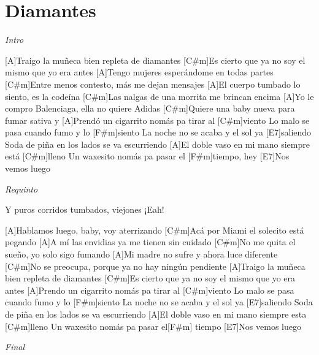 \section{Diamantes}

\noindent
\vspace{1cm}

\begin{guitar}
	\begin{multicols}{2}
		
		\textit{Intro}
		\par

		[A]Traigo la muñeca bien repleta de diamantes
		[C#m]Es cierto que ya no soy el mismo que yo era antes
		[A]Tengo mujeres esperándome en todas partes
		[C#m]Entre menos contesto, más me dejan mensajes
		[A]El cuerpo tumbado lo siento, es la codeína
		[C#m]Las nalgas de una morrita me brincan encima
		[A]Yo le compro Balenciaga, ella no quiere Adidas
		[C#m]Quiere una baby nueva para fumar sativa y
		[A]Prendó un cigarrito nomás pa tirar al [C#m]viento
		Lo malo se pasa cuando fumo y lo [F#m]siento
		La noche no se acaba y el sol ya [E7]saliendo
		Soda de piña en los lados se va escurriendo
		[A]El doble vaso en mi mano siempre está [C#m]lleno
		Un waxesito nomás pa pasar el [F#m]tiempo, hey
		[E7]Nos vemos luego

		\par
		\textit{Requinto}
		\par

		Y puros corridos tumbados, viejones
		¡Eah!
		
		[A]Hablamos luego, baby, voy aterrizando
		[C#m]Acá por Miami el solecito está pegando
		[A]A mí las envidias ya me tienen sin cuidado
		[C#m]No me quita el sueño, yo solo sigo fumando
		[A]Mi madre no sufre y ahora luce diferente
		[C#m]No se preocupa, porque ya no hay ningún pendiente
		[A]Traigo la muñeca bien repleta de diamantes
		[C#m]Es cierto que ya no soy el mismo que yo era antes
		[A]Prendo un cigarrito nomás pa tirar al [C#m]viento
		Lo malo se pasa cuando fumo y lo [F#m]siento
		La noche no se acaba y el sol ya [E7]saliendo
		Soda de piña en los lados se va escurriendo
		[A]El doble vaso en mi mano siempre esta [C#m]lleno
		Un waxesito nomás pa pasar el[F#m] tiempo
		[E7]Nos vemos luego

		\par
		\textit{Final}

	\end{multicols}
\end{guitar}
